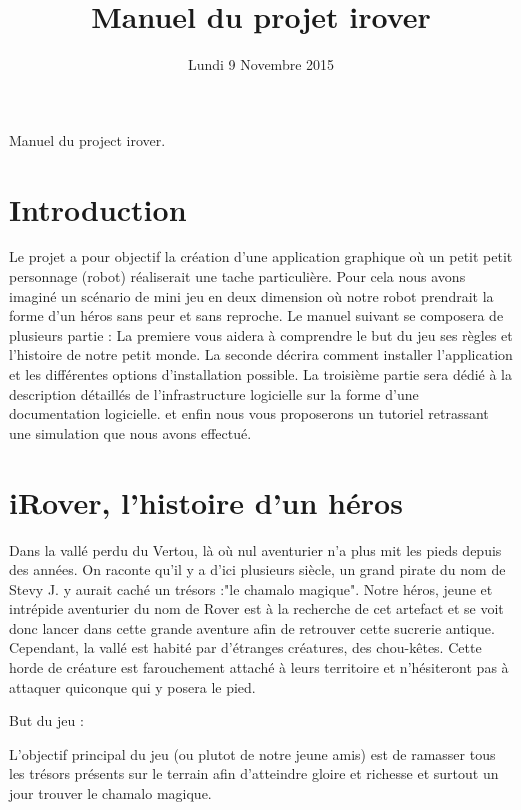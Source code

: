\documentclass[a4paper 12pts]{article}
\title{Manuel du projet irover}
\date{Lundi 9 Novembre 2015}
\author{}
\begin{document}
\maketitle

Manuel du project irover.


\newpage

\tableofcontents

\section{Introduction}



Le projet a pour objectif la création d'une application graphique où un petit petit personnage (robot) réaliserait une tache particulière.
Pour cela nous avons imaginé un scénario de mini jeu en deux dimension où notre robot prendrait la forme d'un héros sans peur et sans reproche.
Le manuel suivant se composera de plusieurs partie :
La premiere vous aidera à comprendre le but du jeu ses règles et l'histoire de notre petit monde.
La seconde décrira comment installer l'application et les différentes options d'installation possible. 
La troisième partie sera dédié à la description détaillés de l'infrastructure logicielle sur la forme d'une documentation logicielle. 
et enfin nous vous proposerons un tutoriel retrassant une simulation que nous avons effectué.


\section{iRover, l'histoire d'un héros}


Dans la vallé perdu du Vertou, là où nul aventurier n'a plus mit les pieds depuis des années. On raconte qu'il y a d'ici
plusieurs siècle, un grand pirate du nom de Stevy J. y aurait caché un trésors :"le chamalo magique".
Notre héros, jeune et intrépide aventurier du nom de Rover est à la recherche de cet artefact et se voit donc lancer 
dans cette grande aventure afin de retrouver cette sucrerie antique.
Cependant, la vallé est habité par d'étranges créatures, des chou-kêtes. Cette horde de créature est farouchement attaché à leurs territoire
et n'hésiteront pas à attaquer quiconque qui y posera le pied.

But du jeu :

L'objectif  principal du jeu (ou plutot de notre jeune amis) est de ramasser tous les trésors présents 
sur le terrain afin d'atteindre gloire et richesse et surtout un jour trouver le chamalo magique.
\end{document}
